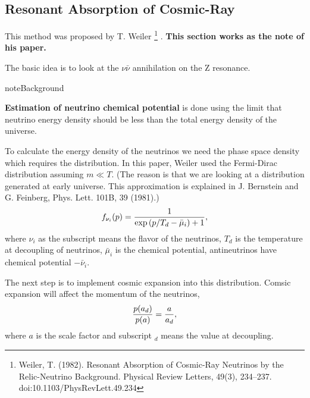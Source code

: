 \documentclass[letterpaper,12pt,english]{sphinxmanual}
\begin{document}
\subsection{Resonant Absorption of Cosmic-Ray}
\label{cosmology:resonant-absorption-of-cosmic-ray}
This method was proposed by T. Weiler \footnote{
Weiler, T. (1982). Resonant Absorption of Cosmic-Ray Neutrinos by the Relic-Neutrino Background. Physical Review Letters, 49(3), 234–237. doi:10.1103/PhysRevLett.49.234
} . \textbf{This section works as the note of his paper.}

The basic idea is to look at the \(\nu \bar\nu\) annihilation on the Z resonance.

\begin{notice}{note}{Background}

\textbf{Estimation of neutrino chemical potential} is done using the limit that neutrino energy density should be less than the total energy density of the universe.

To calculate the energy density of the neutrinos we need the phase space density which requires the distribution. In this paper, Weiler used the Fermi-Dirac distribution assuming \(m\ll T\). (The reason is that we are looking at a distribution generated at early universe. This approximation is explained in J. Bernstein and G. Feinberg, Phys. Lett. 101B, 39 (1981).)
\begin{gather}
\begin{split}f_{\nu_i}(p) = \frac{1}{ \exp\left( p/T_d - \bar \mu_i \right) +1 },\end{split}\notag
\end{gather}
where \(\nu_i\) as the subscript means the flavor of the neutrinos, \(T_d\) is the temperature at decoupling of neutrinos, \(\bar\mu_i\) is the chemical potential, antineutrinos have chemical potential \(-\bar\nu_i\).

The next step is to implement cosmic expansion into this distribution. Comsic expansion will affect the momentum of the neutrinos,
\begin{gather}
\begin{split}\frac{p(a_d)}{p(a)} = \frac{a}{a_d},\end{split}\notag
\end{gather}
where \(a\) is the scale factor and subscript \({}_d\) means the value at decoupling.


\end{notice}
\end{document}
